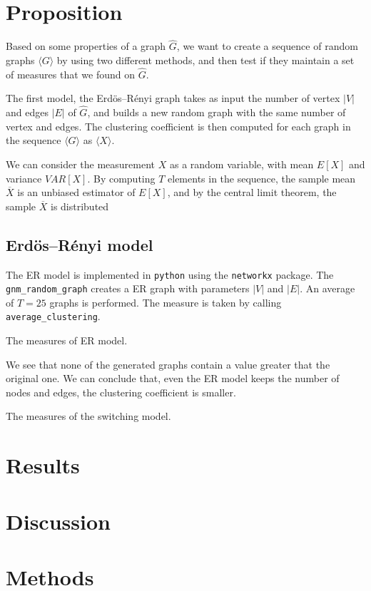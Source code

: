\documentclass[a4paper]{article}
\begin{document}
\section{Proposition}

Based on some properties of a graph $\hat G$, we want to create a sequence of 
random graphs $\langle G \rangle$ by using two different methods, and then test 
if they maintain a set of measures that we found on $\hat G$.

The first model, the Erdös--Rényi graph takes as input the number of vertex 
$|V|$ and edges $|E|$ of $\hat G$, and builds a new random graph with the same 
number of vertex and edges. The clustering coefficient is then computed for each 
graph in the sequence $\langle G \rangle$ as $\langle X \rangle$.

We can consider the measurement $X$ as a random variable, with mean $E[X]$ and 
variance $VAR[X]$. By computing $T$ elements in the sequence, the sample mean 
$\overline X$ is an unbiased estimator of $E[X]$, and by the central limit 
theorem, the sample $\overline X$ is distributed 

\subsection{Erdös--Rényi model}

The ER model is implemented in \texttt{python} using the \texttt{networkx} 
package.  The \texttt{gnm\_random\_graph} creates a ER graph with parameters 
$|V|$ and $|E|$. An average of $T = 25$ graphs is performed. The measure is 
taken by calling \texttt{average\_clustering}.
%
\begin{table}[h]
	\centering
	
	\caption{The measures of ER model.}
	\label{tab:er}
\end{table}
%
We see that none of the generated graphs contain a value greater that the 
original one. We can conclude that, even the ER model keeps the number of nodes 
and edges, the clustering coefficient is smaller.

%
\begin{table}[h]
	\centering
	
	\caption{The measures of the switching model.}
	\label{tab:switch}
\end{table}
%
\section{Results}



\section{Discussion}

\section{Methods}





\end{document}
